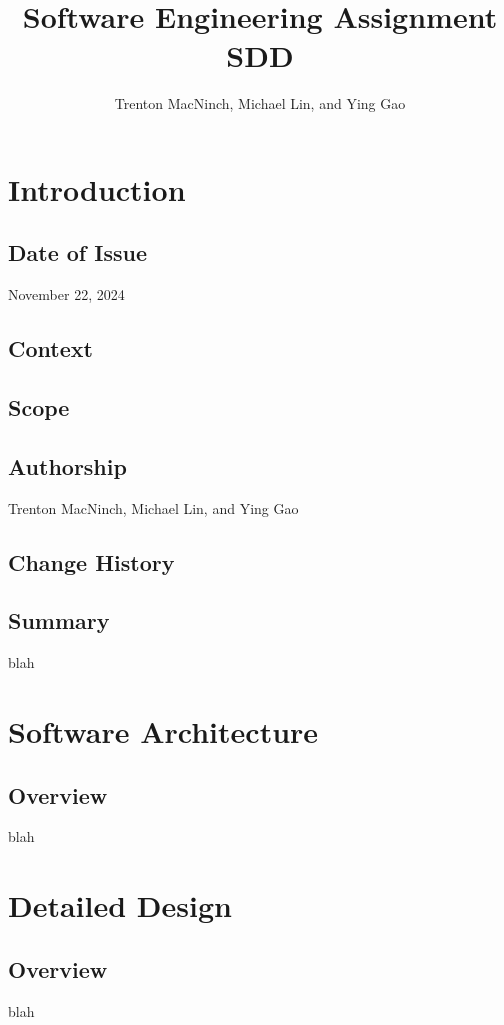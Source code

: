 \documentclass{article}
\title{\textbf{Software Engineering Assignment SDD}}
\author{Trenton MacNinch, Michael Lin, and Ying Gao}
\begin{document}
\maketitle
\newpage

\tableofcontents
\newpage

\section{Introduction}
\subsection{Date of Issue}
November 22, 2024
\subsection{Context}
\subsection{Scope}
\subsection{Authorship}
Trenton MacNinch, Michael Lin, and Ying Gao
\subsection{Change History}
\subsection{Summary}
blah

\section{Software Architecture}
\subsection{Overview}
blah

\section{Detailed Design}
\subsection{Overview}
blah
\end{document}
